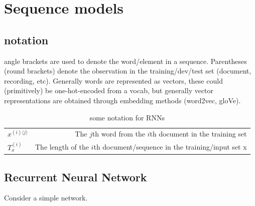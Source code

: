 \documentclass{article}
\begin{document}
\section{Sequence models}
\subsection{notation}
angle brackets are used to denote the word/element in a sequence. Parentheses (round brackets) denote the observation in the training/dev/test set (document, recording, etc). Generally words are represented as vectors, these could (primitively) be one-hot-encoded from a vocab, but generally vector representations are obtained through embedding methods (word2vec, gloVe).

\begin{table}[!hbp]
\begin{tabular}{lr}
$x^{(i) \langle j \rangle}$ & The $j$th word from the $i$th document in the training set\\
$T_x^{(i)}$ & The length of the $i$th document/sequence in the training/input set x \\
\end{tabular}
\caption{some notation for RNNs}
\end{table}

\subsection{Recurrent Neural Network}
Consider a simple network. 
\end{document}
